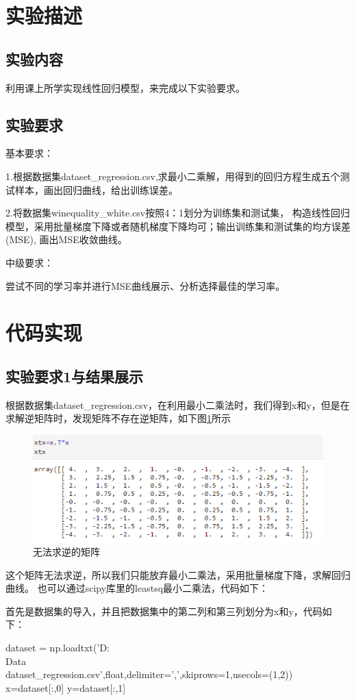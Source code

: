 \documentclass[UTF8,a4paper,10pt]{ctexart}
\begin{document}
\section{实验描述}
\subsection{实验内容}
利用课上所学实现线性回归模型，来完成以下实验要求。
\subsection{实验要求}
基本要求：

1.根据数据集dataset\_regression.csv,求最小二乘解，用得到的回归方程生成五个测试样本，画出回归曲线，给出训练误差。

2.将数据集winequality\_white.csv按照4：1划分为训练集和测试集，
构造线性回归模型，采用批量梯度下降或者随机梯度下降均可；输出训练集和测试集的均方误差(MSE),
画出MSE收敛曲线。

中级要求：

尝试不同的学习率并进行MSE曲线展示、分析选择最佳的学习率。
\section{代码实现}
\subsection{实验要求1与结果展示}
根据数据集dataset\_regression.csv，在利用最小二乘法时，我们得到x和y，但是在求解逆矩阵时，发现矩阵不存在逆矩阵，如下图\ref{fig:1}所示
\begin{figure}[H]
    \centering
    \includegraphics[scale=1]{1.png}
    \caption{无法求逆的矩阵}
    \label{fig:1}
\end{figure}

这个矩阵无法求逆，所以我们只能放弃最小二乘法，采用批量梯度下降，求解回归曲线。
也可以通过scipy库里的leastsq最小二乘法，代码如下：

首先是数据集的导入，并且把数据集中的第二列和第三列划分为x和y，代码如下：
\begin{python}
   dataset = np.loadtxt('D:\\Data\\dataset_regression.csv',float,delimiter=',',skiprows=1,usecols=(1,2))
   x=dataset[:,0]
   y=dataset[:,1]

\end{python}
\end{document}
